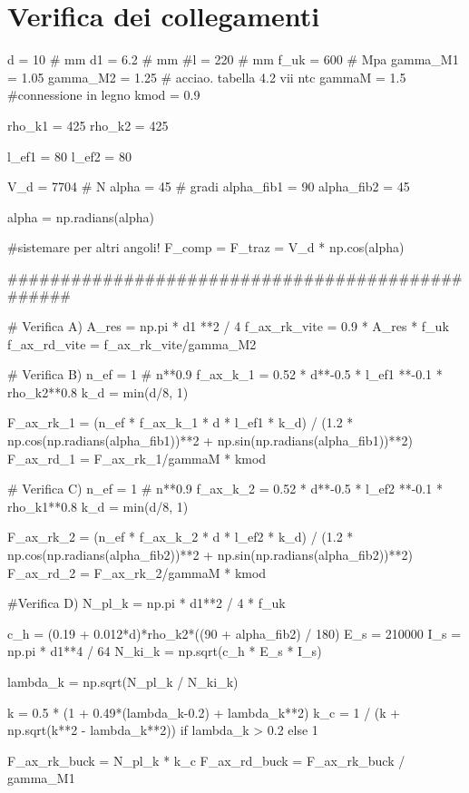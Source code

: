 \chapter{Verifica dei collegamenti}
\begin{pycode}[viti]
d = 10 # mm
d1 = 6.2 # mm
#l = 220 # mm 
f_uk = 600 # Mpa
gamma_M1 = 1.05
gamma_M2 = 1.25 # acciao. tabella 4.2 vii ntc
gammaM = 1.5 #connessione in legno 
kmod = 0.9

rho_k1 = 425
rho_k2 = 425

l_ef1 = 80
l_ef2 = 80

V_d = 7704 # N
alpha = 45 # gradi
alpha_fib1 = 90
alpha_fib2 = 45

alpha = np.radians(alpha)


#sistemare per altri angoli!
F_comp = F_traz = V_d * np.cos(alpha)

#################################################

# Verifica A)
A_res = np.pi * d1 **2 / 4
f_ax_rk_vite = 0.9 * A_res * f_uk 
f_ax_rd_vite = f_ax_rk_vite/gamma_M2

# Verifica B)
n_ef = 1 # n**0.9 
f_ax_k_1 = 0.52 * d**-0.5 * l_ef1 **-0.1 * rho_k2**0.8
k_d = min(d/8, 1)

F_ax_rk_1 = (n_ef * f_ax_k_1 * d * l_ef1 * k_d) / (1.2 * np.cos(np.radians(alpha_fib1))**2 + np.sin(np.radians(alpha_fib1))**2)
F_ax_rd_1 = F_ax_rk_1/gammaM * kmod

# Verifica C)
n_ef = 1 # n**0.9 
f_ax_k_2 = 0.52 * d**-0.5 * l_ef2 **-0.1 * rho_k1**0.8
k_d = min(d/8, 1)

F_ax_rk_2 = (n_ef * f_ax_k_2 * d * l_ef2 * k_d) / (1.2 * np.cos(np.radians(alpha_fib2))**2 + np.sin(np.radians(alpha_fib2))**2)
F_ax_rd_2 = F_ax_rk_2/gammaM * kmod

#Verifica D)
N_pl_k = np.pi * d1**2 / 4 * f_uk

c_h = (0.19 + 0.012*d)*rho_k2*((90 + alpha_fib2) / 180)
E_s = 210000
I_s = np.pi * d1**4 / 64
N_ki_k = np.sqrt(c_h * E_s * I_s)

lambda_k = np.sqrt(N_pl_k / N_ki_k)

k = 0.5 * (1 + 0.49*(lambda_k-0.2) + lambda_k**2)
k_c = 1 / (k + np.sqrt(k**2 - lambda_k**2)) if lambda_k > 0.2 else  1

F_ax_rk_buck = N_pl_k * k_c
F_ax_rd_buck = F_ax_rk_buck / gamma_M1
\end{pycode}
